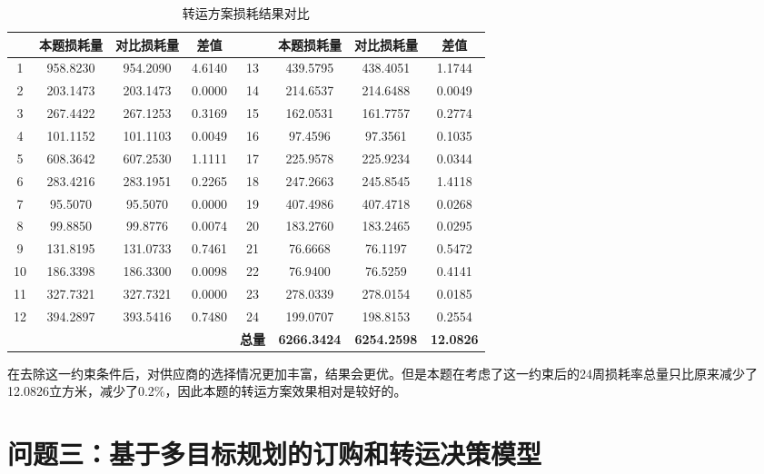 \documentclass[withoutpreface,bwprint]{cumcmthesis} %
\begin{document}
\begin{table}[h]
    \caption{转运方案损耗结果对比}\label{tab005} \centering
    \centering
    \begin{tabular}{|c|c|c|c|c|c|c|c|}
    \hline
    & \textbf{本题损耗量} & \textbf{对比损耗量} & \textbf{差值} &  & \textbf{本题损耗量} & \textbf{对比损耗量} & \textbf{差值} \\ \hline
    1 & 958.8230 & 954.2090 & 4.6140 & 13 & 439.5795  & 438.4051  & 1.1744  \\ \hline
        2 & 203.1473 & 203.1473 & 0.0000 & 14 & 214.6537  & 214.6488  & 0.0049  \\ \hline
        3 & 267.4422 & 267.1253 & 0.3169 & 15 & 162.0531  & 161.7757  & 0.2774  \\ \hline
        4 & 101.1152 & 101.1103 & 0.0049 & 16 & 97.4596  & 97.3561  & 0.1035  \\ \hline
        5 & 608.3642 & 607.2530 & 1.1111 & 17 & 225.9578  & 225.9234  & 0.0344  \\ \hline
        6 & 283.4216 & 283.1951 & 0.2265 & 18 & 247.2663  & 245.8545  & 1.4118  \\ \hline
        7 & 95.5070 & 95.5070 & 0.0000 & 19 & 407.4986  & 407.4718  & 0.0268  \\ \hline
        8 & 99.8850 & 99.8776 & 0.0074 & 20 & 183.2760  & 183.2465  & 0.0295  \\ \hline
        9 & 131.8195 & 131.0733 & 0.7461 & 21 & 76.6668  & 76.1197  & 0.5472  \\ \hline
        10 & 186.3398 & 186.3300 & 0.0098 & 22 & 76.9400  & 76.5259  & 0.4141  \\ \hline
        11 & 327.7321 & 327.7321 & 0.0000 & 23 & 278.0339  & 278.0154  & 0.0185  \\ \hline
        12 & 394.2897 & 393.5416 & 0.7480 & 24 & 199.0707  & 198.8153  & 0.2554  \\ \hline
         &  &  &  & \textbf{总量} & \textbf{6266.3424}  & \textbf{6254.2598}  & \textbf{12.0826}  \\ \hline
    \end{tabular}
\end{table}

在去除这一约束条件后，对供应商的选择情况更加丰富，结果会更优。但是本题在考虑了这一约束后的24周损耗率总量只比原来减少了12.0826立方米，减少了0.2\%，因此本题的转运方案效果相对是较好的。

\section{问题三：基于多目标规划的订购和转运决策模型}
\end{document}
